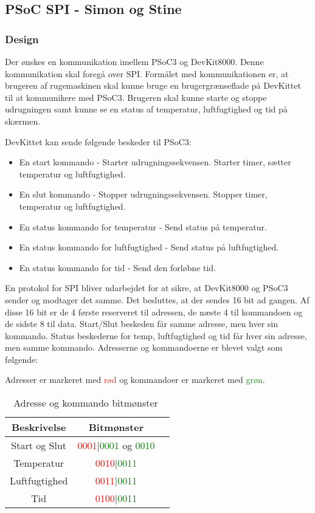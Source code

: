 
\newpage
\subsection{PSoC SPI - Simon og Stine}\label{psoc_spi}

\subsubsection{Design}
Der ønskes en kommunikation imellem PSoC3 og DevKit8000. Denne kommunikation skal foregå over SPI.
Formålet med kommunikationen er, at brugeren af rugemaskinen skal kunne bruge en brugergrænseflade på DevKittet til at kommunikere med PSoC3. Brugeren skal kunne starte og stoppe udrugningen samt kunne se en status af temperatur, luftfugtighed og tid på skærmen.

DevKittet kan sende følgende beskeder til PSoC3:
\begin{itemize}
  \item En start kommando - Starter udrugningssekvensen. Starter timer, sætter temperatur og luftfugtighed. 
  \item En slut kommando - Stopper udrugningssekvensen. Stopper timer, temperatur og luftfugtighed.
  \item En status kommando for temperatur - Send status på temperatur.
  \item En status kommando for luftfugtighed - Send status på luftfugtighed.
  \item En status kommando for tid - Send den forløbne tid.
\end{itemize}

En protokol for SPI bliver udarbejdet for at sikre, at DevKit8000 og PSoC3 sender og modtager det samme.
Det besluttes, at der sendes 16 bit ad gangen. Af disse 16 bit er de 4 første reserveret til adressen, de næste 4 til kommandoen og de sidste 8 til data.
Start/Slut beskeden får samme adresse, men hver sin kommando.
Status beskederne for temp, luftfugtighed og tid får hver sin adresse, men samme kommando.
Adresserne og kommandoerne er blevet valgt som følgende:

Adresser er markeret med \textcolor{red}{rød} og kommandoer er markeret med \textcolor{green}{grøn}.

\begin{table}[H]
    \begin{tabular}{|c|c|c|}
        \hline
        \textbf{Beskrivelse}&\textbf{Bitmønster}\\\hline
        Start og Slut&\textcolor{red}{0001}|\textcolor{green}{0001} og \textcolor{green}{0010}\\\hline
        Temperatur&\textcolor{red}{0010}|\textcolor{green}{0011}\\\hline
        Luftfugtighed&\textcolor{red}{0011}|\textcolor{green}{0011}\\\hline
        Tid&\textcolor{red}{0100}|\textcolor{green}{0011}\\\hline
    \end{tabular}
    \caption[Tabel]{Adresse og kommando bitmønster\hfill \textcolor{white}{.}}
    \label{tab:addrcmd}
\end{table}

